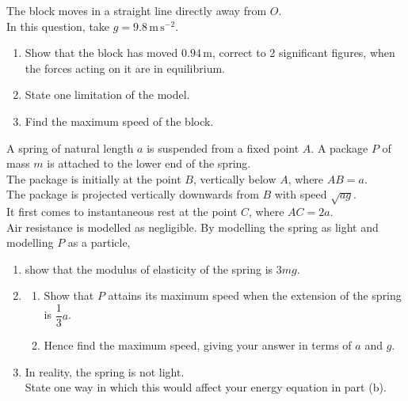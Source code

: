 \documentclass[leqno]{article}
\begin{document}
\begin{enumerate}[
  label=\textbf{\arabic*.},
  leftmargin=*,
  topsep=0pt,
  partopsep=0pt,
  parsep=0pt
]
The block moves in a straight line directly away from $O$. \\
In this question, take $g = 9.8\,\mathrm{m\,s^{-2}}$. \\
\begin{enumerate}[label=\textbf{(\alph*)}]
  \item Show that the block has moved $0.94\,\mathrm{m}$, correct to 2 significant figures, when the forces acting on it are in equilibrium.  \\
  \item State one limitation of the model.  \\
  \item Find the maximum speed of the block.  \\
\end{enumerate}

\newpage

\questionitem

A spring of natural length $a$ is suspended from a fixed point $A$. A package $P$ of mass $m$ is attached to the lower end of the spring. \\

The package is initially at the point $B$, vertically below $A$, where $AB=a$. \\

The package is projected vertically downwards from $B$ with speed $\sqrt{ag}$. \\

It first comes to instantaneous rest at the point $C$, where $AC=2a$. \\

Air resistance is modelled as negligible. By modelling the spring as light and modelling $P$ as a particle, \\
\begin{enumerate}[label=\textbf{(\alph*)}]
  \item show that the modulus of elasticity of the spring is $3mg$.  \\
  \item
  \begin{enumerate}[label=(\roman*)]
    \item Show that $P$ attains its maximum speed when the extension of the spring is $\dfrac{1}{3}a$. 
    \item Hence find the maximum speed, giving your answer in terms of $a$ and $g$.  \\
  \end{enumerate}
  \item In reality, the spring is not light. \\
  State one way in which this would affect your energy equation in part (b).  \\
\end{enumerate}


\end{enumerate}
\end{document}
